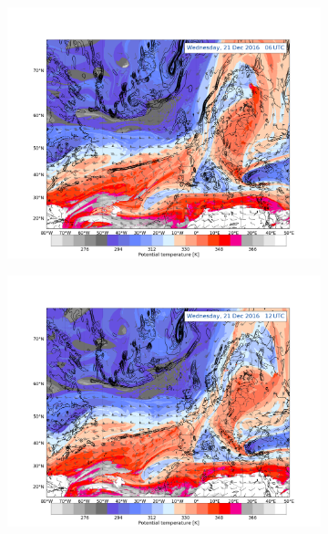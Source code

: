 \begin{figure}[ht!]
	\centering
	\begin{subfigure}[b]{0.49\textwidth}
		\includegraphics[trim={4.2cm 0cm 4.3cm 5.1cm},clip,
		width=\textwidth]{./fig_DynTropo/20161221_06}
		\caption{} \label{fig:DT21_06}
	\end{subfigure}
	\begin{subfigure}[b]{0.49\textwidth}
		\includegraphics[trim={4.2cm 0cm 4.3cm 5.1cm},clip,
		width=\textwidth]{./fig_DynTropo/20161221_12}
		\caption{} \label{fig:DT21}
	\end{subfigure}

\end{figure}
